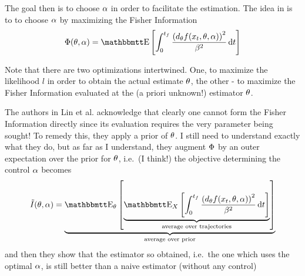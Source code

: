 \documentclass{article}
\begin{document}
The goal then is to choose ${\alpha}$ in order to facilitate the estimation. The idea
in \cite{Lin} is to to choose ${\alpha}$ by maximizing the Fisher Information
\begin{equation}
\FI(\th, \a) = \Exp \left[ \int_0^\tf \frac{ \left( d_\th f(x_t,\th, \a)
\right)^2}{\b^2}
\intd{t}
\right]
\label{eq:Fisher_Information}
\end{equation}

Note that there are two optimizations intertwined. One, to maximize
the likelihood $l$ in order to obtain the actual estimate ${\theta}$, the other - to
maximize the Fisher Information evaluated at the (a priori unknown!) estimator ${\theta}$.

The authors in Lin et al. \cite{Lin} acknowledge that clearly one cannot form
the Fisher Information directly since its evaluation requires the very
parameter being sought! To remedy this, they apply a prior of ${\theta}$. I
still need to understand exactly what they do, but as far as I understand, they
augment ${\Phi}$ by an outer expectation over the prior for ${\theta}$, i.e.\ (I think!) 
the objective determining the control ${\alpha}$ becomes
\begin{equation}
\tilde{I}(\th, \a) = \underbrace{\Exp_\th \left [
\underbrace{\Exp_{X} \left[ \int_0^\tf
\frac{ \left( d_\th f(x_t,\th, \a) \right)^2}{\b^2}
\intd{t}
\right]}_{\textrm{average over trajectories}}
\right]}_{\textrm{average over prior}}
\label{eq:Fisher_Information}
\end{equation}
and then they show that the estimator so obtained, i.e.\ the one which uses the
optimal ${\alpha}$, is still better than a naive estimator (without any control)

% 


 

% 
\end{document}
